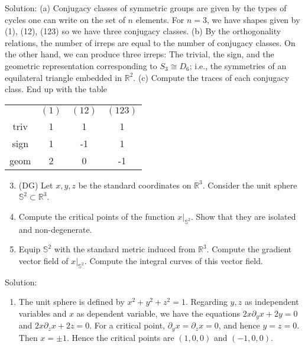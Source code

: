 \documentclass[10pt]{article}
\begin{document}
Solution: (a) Conjugacy classes of symmetric groups are given by the types of cycles one can write on the set of $n$ elements. For $n=3$, we have shapes given by (1), (12), (123) so we have three conjugacy classes. (b) By the orthogonality relations, the number of irreps are equal to the number of conjugacy classes. On the other hand, we can produce three irreps: The trivial, the sign, and the geometric representation corresponding to $S_{3} \cong D_{6}$; i.e., the symmetries of an equilateral triangle embedded in $\mathbb{R}^{2}$. (c) Compute the traces of each conjugacy class. End up with the table

\begin{center}
\begin{tabular}{c|c|c|c}
 & $(1)$ & $(12)$ & $(123)$ \\
triv & 1 & 1 & 1 \\
sign & 1 & -1 & 1 \\
geom & 2 & 0 & -1 \\
\end{tabular}
\end{center}

\begin{enumerate}
  \setcounter{enumi}{2}
  \item (DG) Let $x, y, z$ be the standard coordinates on $\mathbb{R}^{3}$. Consider the unit sphere $\mathbb{S}^{2} \subset \mathbb{R}^{3}$.

  \item Compute the critical points of the function $\left.x\right|_{\mathbb{S}^{2}}$. Show that they are isolated and non-degenerate.

  \item Equip $\mathbb{S}^{2}$ with the standard metric induced from $\mathbb{R}^{3}$. Compute the gradient vector field of $\left.x\right|_{\mathbb{S}^{2}}$. Compute the integral curves of this vector field.

\end{enumerate}

Solution:

\begin{enumerate}
  \item The unit sphere is defined by $x^{2}+y^{2}+z^{2}=1$. Regarding $y, z$ as independent variables and $x$ as dependent variable, we have the equations $2 x \partial_{y} x+2 y=0$ and $2 x \partial_{z} x+2 z=0$. For a critical point, $\partial_{y} x=\partial_{z} x=0$, and hence $y=z=0$. Then $x= \pm 1$. Hence the critical points are $(1,0,0)$ and $(-1,0,0)$.
\end{enumerate}
\end{document}
